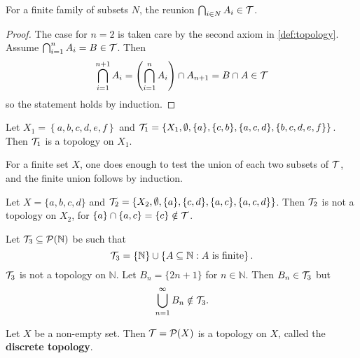 \documentclass[../../main/main.tex]{subfiles}
\begin{document}
\begin{remark}
  For a finite family of subsets $N$, the reunion $\bigcap_{i \in N} A_{i} \in \mathcal{T}$.
\end{remark}
\begin{proof}
  The case for $n = 2$ is taken care by the second axiom in \ref{def:topology}. Assume $\bigcap_{i=1}^{n} A_{i} = B \in \mathcal{T}$. Then
  \begin{equation*}
    \bigcap_{i=1}^{n+1} A_{i} = \left(  \bigcap_{i=1}^{n} A_{i} \right) \cap A_{n+1} = B \cap A \in \mathcal{T}
  \end{equation*}
  so the statement holds by induction.
\end{proof}

\begin{example}
  Let $X_{1} = \left\{ a, b, c, d, e, f \right\}$ and $\mathcal{T}_{1} = \left\{ X_{1}, \emptyset, \{a\}, \{c, b\}, \{a, c, d\}, \{b, c, d, e, f\} \right\}$. Then $\mathcal{T}_{1}$ is a topology on $X_{1}$.
\end{example}

\begin{remark}
  For a finite set $X$, one does enough to test the union of each two subsets of $\mathcal{T}$, and the finite union follows by induction.
\end{remark}

\begin{example}
  Let $X = \{a, b, c, d\}$ and $\mathcal{T}_{2} = \left\{ X_{2}, \emptyset, \{a\}, \{c, d\}, \{a, c\}, \{a, c, d\} \right\}$. Then $\mathcal{T}_{2}$ is not a topology on $X_{2}$, for $\{a\} \cap \{a, c\} = \{c\} \notin \mathcal{T}$.
\end{example}

\begin{example}
  Let $\mathcal{T}_{3} \subseteq \mathcal{P}(\mathbb{N})$ be such that
  \begin{equation*}
    \mathcal{T}_{3} = \{\mathbb{N}\} \cup \left\{ A \subseteq \mathbb{N} : A \text{ is finite} \right\}.
  \end{equation*}
  $\mathcal{T}_{3}$ is not a topology on $\mathbb{N}$. Let $B_{n} = \{2 n + 1\}$ for $n \in \mathbb{N}$. Then $B_{n} \in \mathcal{T}_{3}$ but
  \begin{equation*}
    \bigcup_{n = 1}^{\infty} B_{n} \notin \mathcal{T}_{3}.
  \end{equation*}
\end{example}

\begin{definition}
  \label{def:discrete-topology}
  Let  $X$ be a non-empty set. Then $\mathcal{T} = \mathcal{P}(X)$ is a topology on $X$, called the {\bf discrete topology}.
\end{definition}
\end{document}
